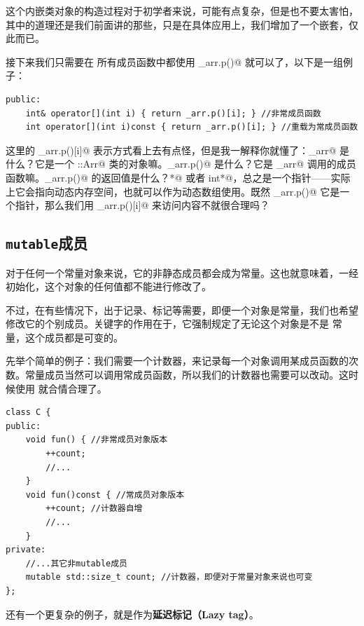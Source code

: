 这个内嵌类对象的构造过程对于初学者来说，可能有点复杂，但是也不要太害怕，其中的道理还是我们前面讲的那些，只是在具体应用上，我们增加了一个嵌套，仅此而已。\par
接下来我们只需要在 \lstinline@valarri@ 所有成员函数中都使用 \lstinline@_arr.p()@ 就可以了，以下是一组例子：
\begin{lstlisting}
public:
    int& operator[](int i) { return _arr.p()[i]; } //非常成员函数
    int operator[](int i)const { return _arr.p()[i]; } //重载为常成员函数
\end{lstlisting}
这里的 \lstinline@_arr.p()[i]@ 表示方式看上去有点怪，但是我一解释你就懂了：\lstinline@_arr@ 是什么？它是一个 \lstinline@valarri::Arr@ 类的对象嘛。\lstinline@_arr.p()@ 是什么？它是 \lstinline@_arr@ 调用的成员函数嘛。\lstinline@_arr.p()@ 的返回值是什么？\lstinline@int*@ 或者 \lstinline@const int*@，总之是一个指针——实际上它会指向动态内存空间，也就可以作为动态数组使用。既然 \lstinline@_arr.p()@ 它是一个指针，那么我们用 \lstinline@_arr.p()[i]@ 来访问内容不就很合理吗？\par
\subsection*{\texttt{mutable}成员}
对于任何一个常量对象来说，它的非静态成员都会成为常量。这也就意味着，一经初始化，这个对象的任何值都不能进行修改了。\par
不过，在有些情况下，出于记录、标记等需要，即便一个对象是常量，我们也希望修改它的个别成员。\lstinline@mutable@ 关键字的作用在于，它强制规定了无论这个对象是不是 \lstinline@const@ 常量，这个成员都是可变的。\par
先举个简单的例子：我们需要一个计数器，来记录每一个对象调用某成员函数的次数。常量成员当然可以调用常成员函数，所以我们的计数器也需要可以改动。这时候使用 \lstinline@mutable@ 就合情合理了。
\begin{lstlisting}
class C {
public:
    void fun() { //非常成员对象版本
        ++count;
        //...
    }
    void fun()const { //常成员对象版本
        ++count; //计数器自增
        //...
    }
private:
    //...其它非mutable成员
    mutable std::size_t count; //计数器，即便对于常量对象来说也可变
};
\end{lstlisting}\par
还有一个更复杂的例子，就是作为\textbf{延迟标记（Lazy tag）}。
